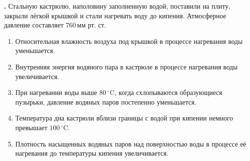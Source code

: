 \documentclass[12pt,a4paper]{article}
\newif\ifShowSolutions
\newcounter{banktask}
\newcommand{\BankTask}[3]{%
  \refstepcounter{banktask}%
  \Needspace{35mm}\par\medskip\noindent\begin{minipage}{\linewidth}%
  \noindent\textbf{\thebanktask.}\quad #2\par
  \ifShowSolutions
    #3\par
    \ifdefined\TutorEdition
      \ifcsname TutorSource#1\endcsname
        \smallskip{\small\csname TutorSource#1\endcsname\par}%
      \fi
    \fi
  \fi
  \end{minipage}\par\medskip
}
\begin{document}
\BankTask{055098}{
Стальную кастрюлю, наполовину заполненную водой, поставили на плиту, закрыли лёгкой крышкой и стали нагревать воду до кипения. Атмосферное давление составляет \(760\,\text{мм рт. ст.}\)
\begin{enumerate}
\item Относительная влажность воздуха под крышкой в процессе нагревания воды уменьшается.
\item Внутренняя энергия водяного пара в кастрюле в процессе нагревания воды увеличивается.
\item При нагревании воды выше \(80\,^{\circ}\mathrm{C}\), когда схлопываются образующиеся пузырьки, давление водяных паров постепенно уменьшается.
\item Температура дна кастрюли вблизи границы с водой при кипении немного превышает \(100\,^{\circ}\mathrm{C}\).
\item Плотность насыщенных водяных паров над поверхностью воды в процессе её нагревания до температуры кипения увеличивается.
\end{enumerate}
}{
\smallskip\noindent\textbf{Решение от GPT}\par
1) Неверно: под крышкой воздух насыщается водяным паром, его относительная влажность не уменьшается.

2) Верно: при нагревании растут температура и количество водяного пара, поэтому его внутренняя энергия увеличивается.

3) Неверно: давление насыщенного пара с повышением температуры увеличивается; пузырьки схлопываются при попадании в более холодные слои воды вследствие конденсации пара.

4) Верно: при данном атмосферном давлении вода кипит при \(100\,^{\circ}\mathrm{C}\); для передачи теплоты от дна воде температура дна должна быть немного выше.

5) Верно: плотность насыщенного водяного пара увеличивается с температурой.

Ответ: \(245\).
}
\end{document}
